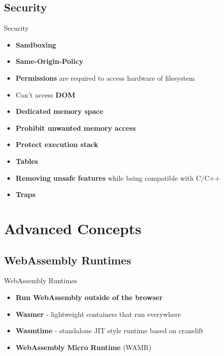 \documentclass{beamer}
\begin{document}
\subsection{Security}

\begin{frame}{Security}
    \begin{itemize}
    \item \textbf{Sandboxing}
    \item \textbf{Same-Origin-Policy}
    \item \textbf{Permissions} are required to access hardware of filesystem
    \item Can't access \textbf{DOM}
    \item \textbf{Dedicated memory space}
    \item \textbf{Prohibit unwanted memory access}
    \item \textbf{Protect execution stack}
    \item \textbf{Tables}
    \item \textbf{Removing unsafe features} while being compatible with C/C++
    \item \textbf{Traps}
    \end{itemize}
\end{frame}

\section{Advanced Concepts}

\subsection{WebAssembly Runtimes}

\begin{frame}{WebAssembly Runtimes}
    \begin{itemize}
        \item \textbf{Run WebAssembly outside of the browser}
        \item \textbf{Wasmer} - lightweight containers that run everywhere
        \item \textbf{Wasmtime} - standalone JIT style runtime based on cranelift
        \item \textbf{WebAssembly Micro Runtime} (WAMR)
    \end{itemize}
\end{frame}
\end{document}

